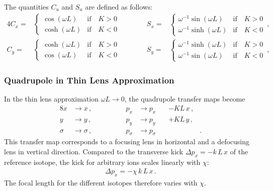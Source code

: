 The quantities $C_u$ and $S_u$ are defined as follows:
\begin{alignat}{4}
C_x = &\begin{cases}  \cos \left( \omega L \right)  & \text{if} \quad  K>0 \\ 
\cosh \left( \omega L \right)  & \text{if} \quad  K<0 \end{cases} \quad \quad \quad&S_x = &\begin{cases}  \omega^{-1}  \sin \left( \omega L \right)  & \text{if} \quad  K>0 \\ \omega^{-1}\sinh \left( \omega L \right)  & \text{if} \quad  K<0 \end{cases}
\, , \\ 
C_y = &\begin{cases}  \cosh \left( \omega L \right)  & \text{if} \quad  K>0 \\ 
\cos \left( \omega L \right)  & \text{if} \quad  K<0 \end{cases} \quad \quad \quad&S_y = &\begin{cases}  \omega^{-1}  \sinh \left( \omega L \right)  & \text{if} \quad  K>0 \\ \omega^{-1}\sin \left( \omega L \right)   & \text{if} \quad  K<0 \end{cases}
\, , 
\end{alignat}




\subsubsection{Quadrupole in Thin Lens Approximation}
In the thin lens approximation $\omega L \rightarrow 0$, the quadrupole transfer maps become
\begin{alignat}{8}
x &\rightarrow x \, ,  \quad \quad \quad \quad &p_x &\rightarrow  p_x &&-  K L \, x \, , \\ 
y &\rightarrow y \, ,  \quad \quad \quad \quad &p_y &\rightarrow  p_y &&+  K L \, y \, , \\
\sigma &\rightarrow \sigma \, ,  \quad \quad \quad \quad &p_\sigma &\rightarrow  p_\sigma \, &&  &.
\end{alignat}
This transfer map corresponds to a focusing lens in horizontal and a defocusing lens in vertical direction. Compared to the transverse kick $\Delta p_{x} = - k \, L\, x$ of the reference isotope, the kick for arbitrary ions scales linearly with $\chi$:
\begin{align}
\Delta p_{x} = - \chi \, k \, L \, x \, .
\end{align}
The focal length for the different isotopes therefore varies with $\chi$.	

